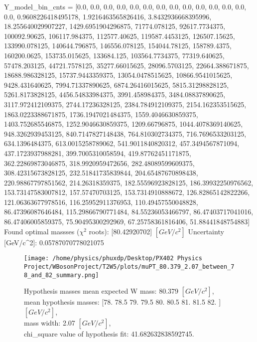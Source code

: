 \documentclass[12pt]{article}
\begin{document}
	Y\_model\_bin\_cnts = [0.0, 0.0, 0.0, 0.0, 0.0, 0.0, 0.0, 0.0, 0.0, 0.0, 0.0, 0.0, 0.0, 0.0, 0.9608226418495178, 1.9216463565826416, 3.8432936668395996, 18.255640029907227, 1429.6951904296875, 71774.078125, 92617.7734375, 100092.90625, 106117.984375, 112577.40625, 119587.4453125, 126507.15625, 133990.078125, 140644.796875, 146556.078125, 154044.78125, 158789.4375, 160200.0625, 153735.015625, 133684.125, 103564.7734375, 77319.640625, 57478.203125, 44721.7578125, 35277.66015625, 28096.5703125, 22664.388671875, 18688.986328125, 15737.9443359375, 13054.0478515625, 10866.9541015625, 9428.431640625, 7994.71337890625, 6874.26416015625, 5815.31298828125, 5261.8173828125, 4456.54833984375, 3991.458984375, 3484.08837890625, 3117.972412109375, 2744.17236328125, 2384.784912109375, 2154.162353515625, 1863.0223388671875, 1736.1947021484375, 1559.4046630859375, 1403.752685546875, 1252.9046630859375, 1209.66796875, 1044.4078369140625, 948.3262939453125, 840.7147827148438, 764.810302734375, 716.7696533203125, 634.1396484375, 613.0015258789062, 541.9011840820312, 457.3494567871094, 437.1723937988281, 399.7005310058594, 419.87762451171875, 362.22869873046875, 318.9920959472656, 282.48089599609375, 308.42315673828125, 232.51841735839844, 204.65487670898438, 220.98867797851562, 214.26318359375, 182.55596923828125, 186.39932250976562, 153.73147583007812, 157.57470703125, 153.7314910888672, 126.82865142822266, 121.06363677978516, 116.25952911376953, 110.49457550048828, 86.47396087646484, 115.29866790771484, 84.55236053466797, 86.47403717041016, 86.47406005859375, 75.90495300292969, 67.25758361816406, 51.88441848754883]\\

    Found optimal massses ($\chi^2$ roots): [80.42920702] $[GeV/c^{2}]$
    Uncertainty [GeV/c^2]: 0.05787070778021075

	\begin{figure}[tb]
		\centering
		\texttt{[image: /home/physics/phuxdp/Desktop/PX402 Physics Project/WBosonProject/T2W5/plots/muPT\_80.379\_2.07\_between\_78\_and\_82\_summary.png]}
		\caption{\small Hypothesis masses mean expected W mass: 80.379 $[GeV/c^{2}]$,\\
mean hypothesis masses: [78.  78.5 79.  79.5 80.  80.5 81.  81.5 82. ] $[GeV/c^{2}]$,\\
mass width: 2.07 $[GeV/c^{2}]$,\\
chi_square value of hypothesis fit: 41.682632838592745. }
		\label{fig: fig_0}
	\end{figure}
\end{document}
